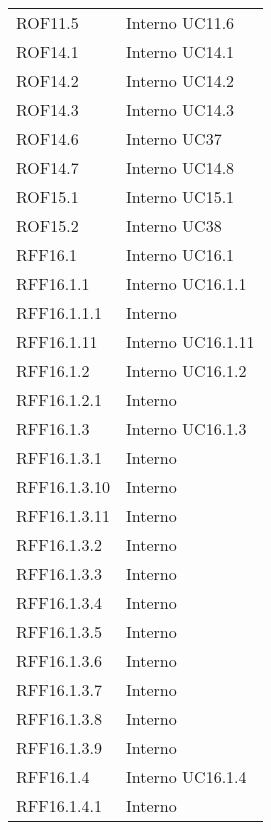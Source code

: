 \begin{longtable}{p{2.5cm}!{\VRule[1pt]}p{2.5cm}}
	\\
	ROF11.5 & Interno \newline UC11.6
	\\
	ROF14.1 & Interno \newline UC14.1
	\\
	ROF14.2 & Interno \newline UC14.2
	\\
	ROF14.3 & Interno \newline UC14.3
	\\
	ROF14.6 & Interno \newline UC37
	\\
	ROF14.7 & Interno \newline UC14.8
	\\
	ROF15.1 & Interno \newline UC15.1
	\\
	ROF15.2 & Interno \newline UC38
	\\
	RFF16.1 & Interno \newline UC16.1
	\\
	RFF16.1.1 & Interno \newline UC16.1.1
	\\
	RFF16.1.1.1 & Interno \\
	RFF16.1.11 & Interno \newline UC16.1.11
	\\
	RFF16.1.2 & Interno \newline UC16.1.2
	\\
	RFF16.1.2.1 & Interno \\
	RFF16.1.3 & Interno \newline UC16.1.3
	\\
	RFF16.1.3.1 & Interno \\
	RFF16.1.3.10 & Interno \\
	RFF16.1.3.11 & Interno \\
	RFF16.1.3.2 & Interno \\
	RFF16.1.3.3 & Interno \\
	RFF16.1.3.4 & Interno \\
	RFF16.1.3.5 & Interno \\
	RFF16.1.3.6 & Interno \\
	RFF16.1.3.7 & Interno \\
	RFF16.1.3.8 & Interno \\
	RFF16.1.3.9 & Interno \\
	RFF16.1.4 & Interno \newline UC16.1.4
	\\
	RFF16.1.4.1 & Interno \\

\end{longtable}
